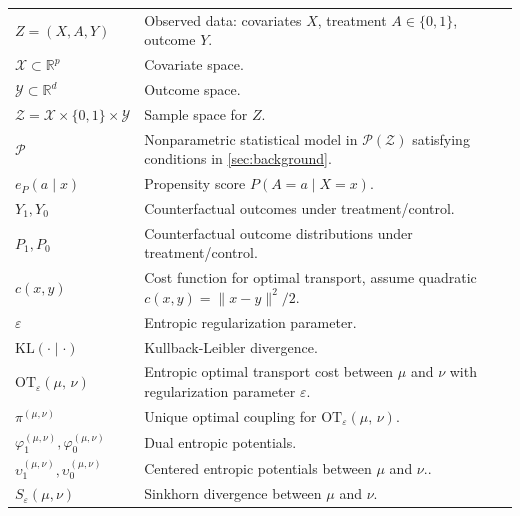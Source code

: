 \documentclass{article}
\theoremstyle{plain}
\theoremstyle{definition}
\theoremstyle{remark}
\newcommand{\R}{\mathbb{R}}
\newcommand{\of}[1]{\left(#1\right)}
\newcommand{\cZ}{\mathcal{Z}}
\newcommand{\cP}{\mathcal{P}}
\newcommand{\cY}{\mathcal{Y}}
\newcommand{\cX}{\mathcal{X}}
\newcommand{\1}{\mathbbm{1}}
\newcommand{\EntOT}[2]{\text{OT}_\eps\of{#1,\, #2}}
\newcommand{\eps}{\varepsilon}
\newcommand{\KL}[2]{\mathrm{KL}(#1 \mid #2)}
\theoremstyle{plain}
\theoremstyle{definition}
\begin{document}
\begin{center}
\begin{small}
\begin{longtable}{@{}ll@{}}
            $Z=(X,A,Y)$ &  Observed data: covariates $X$, treatment $A\in\{0,1\}$, outcome $Y$. \\
            $\cX\subset\R^p$ & Covariate space. \\
            $\cY\subset\R^d$ & Outcome space. \\
            $\cZ=\mathcal X\times\{0,1\}\times\cY$ & Sample space for $Z$. \\
            $\cP$ & Nonparametric statistical model in $\cP(\cZ)$ satisfying conditions in \cref{sec:background}. \\
            $e_P(a\mid x)$ & Propensity score $P(A=a\mid X=x)$. \\
            $Y_1,Y_0$ & Counterfactual outcomes under treatment/control. \\
            $P_1, P_0$ & Counterfactual outcome distributions under treatment/control.\\

            $c(x,y)$ & Cost function for optimal transport, assume quadratic $c(x,y)=\|x-y\|^2/2$. \\
            $\eps$ & Entropic regularization parameter. \\
            $\KL{\cdot}{\cdot}$ & Kullback-Leibler divergence. \\
            $\EntOT{\mu}{\nu}$ &  Entropic optimal transport cost between $\mu$ and $\nu$ with regularization parameter $\eps$.\\
            $\pi^{(\mu,\nu)}$ &  Unique optimal coupling for $\EntOT{\mu}{\nu}$. \\
            $\varphi^{(\mu,\nu)}_1,\varphi^{(\mu,\nu)}_0$ & Dual entropic potentials. \\
            $\upsilon^{(\mu,\nu)}_1,\upsilon^{(\mu,\nu)}_0$ & Centered entropic potentials between $\mu$ and $\nu$.. \\
            $S_\varepsilon(\mu,\nu)$ & Sinkhorn divergence between $\mu$ and $\nu$. \\
            

\end{longtable}
\end{small}
\end{center}
\end{document}
